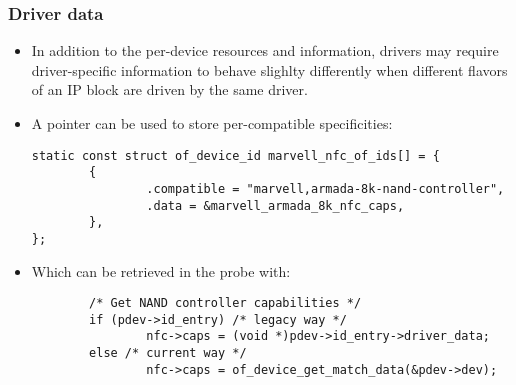 \begin{frame}[fragile]
  \frametitle{Driver data}
  \begin{itemize}
  \item In addition to the per-device resources and information, drivers
    may require driver-specific information to behave slighlty
    differently when different flavors of an IP block are driven by the
    same driver.
  \item A  pointer can be used to store
    per-compatible specificities:
    \begin{block}{}
      \begin{verbatim}
static const struct of_device_id marvell_nfc_of_ids[] = {
        {
                .compatible = "marvell,armada-8k-nand-controller",
                .data = &marvell_armada_8k_nfc_caps,
        },
};
  \end{verbatim}
  \end{block}
  \item Which can be retrieved in the probe with:
    \begin{block}{}
  \begin{verbatim}
        /* Get NAND controller capabilities */
        if (pdev->id_entry) /* legacy way */
                nfc->caps = (void *)pdev->id_entry->driver_data;
        else /* current way */
                nfc->caps = of_device_get_match_data(&pdev->dev);
  \end{verbatim}
  \end{block}
  \end{itemize}
\end{frame}
